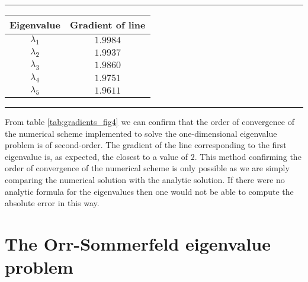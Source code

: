 \documentclass[a4paper, 12pt, twoside, openright]{article}
\numberwithin{equation}{section}
\begin{document}
\begin{table}[H]
\centering
\rule{\linewidth}{1.5pt}
\bgroup
\def\arraystretch{1.25}
\begin{tabular}{ c@{\qquad} c@{\qquad} } 
Eigenvalue & Gradient of line\\\hline
$\lambda_1$ & $1.9984$ \\
$\lambda_2$ & $1.9937$ \\
$\lambda_3$ & $1.9860$ \\
$\lambda_4$ & $1.9751$ \\
$\lambda_5$ & $1.9611$ 
\end{tabular} 
\egroup
{}
\rule{\linewidth}{1.5pt}
\end{table} 
From table \ref{tab;gradients_fig4} we can confirm that the order of convergence of the numerical scheme implemented to solve the one-dimensional eigenvalue problem is of second-order. The gradient of the line corresponding to the first eigenvalue is, as expected, the closest to a value of $2$. This method confirming the order of convergence of the numerical scheme is only possible as we are simply comparing the numerical solution with the analytic solution. If there were no analytic formula for the eigenvalues then one would not be able to compute the absolute error in this way.

%
%
%
%
\newpage
\section{The Orr-Sommerfeld eigenvalue problem}\label{OSeigenvalue_problem}
% 
% 
\end{document}
